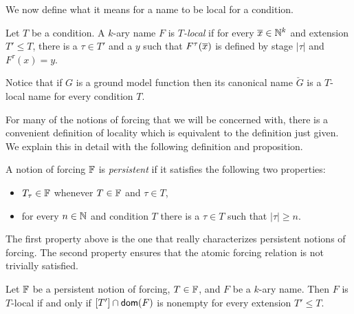 We now define what it means for a name to be local for a condition.

\begin{definition}\label{D:localNames}
Let $T$ be a condition.
A $k$-ary name $F$ is $T$\textit{-local}
if for every $\overline{x}\in\mathbb{N}^k$ and extension $T'\leq T$,
there is a $\tau\in T'$ and a $y$ such that
$F^\tau(\overline{x})$ is defined by stage $|\tau|$ and $F^\tau(x)=y$.
\end{definition}

Notice that if $G$ is a ground model function then its canonical name
$\check{G}$ is a $T$-local name for every condition $T$.

For many of the notions of forcing that we will be concerned with,
there is a convenient definition of locality which is equivalent
to the definition just given.
We explain this in detail with the following definition and proposition.

\begin{definition}
A notion of forcing $\mathbb{F}$ is \textit{persistent}
if it satisfies the following two properties:
\begin{itemize}
\item $T_\tau\in\mathbb{F}$ whenever $T\in\mathbb{F}$ and $\tau\in T$,
\item for every $n\in\mathbb{N}$ and condition $T$ there is a
		$\tau\in T$ such that $|\tau|\geq n$.
\end{itemize}
\end{definition}
The first property above is the one that really
characterizes persistent notions of forcing.
The second property ensures that the
atomic forcing relation is not trivially satisfied.

\begin{prop}[\RCAo]\label{P:PersistentLocalNames}
Let $\mathbb{F}$ be a persistent notion of forcing, $T\in\mathbb{F}$,
and $F$ be a $k$-ary name.
Then $F$ is $T$-local if and only if $[T']\cap\mathsf{dom}(F)$ is nonempty
for every extension $T'\leq T$.
\end{prop}

